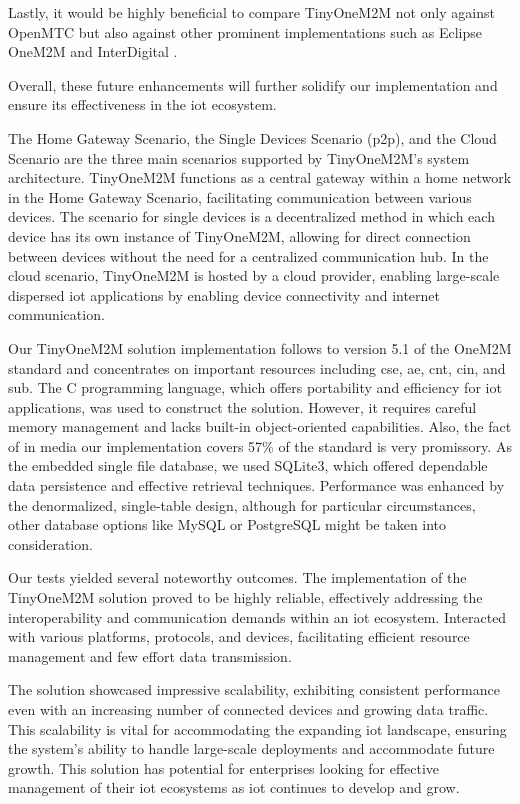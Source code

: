 \documentclass[a4paper,fleqn]{cas-dc}
\begin{document}
Lastly, it would be highly beneficial to compare TinyOneM2M not only against OpenMTC but also against other prominent implementations such as Eclipse OneM2M and InterDigital \cite{M2M2015}.

Overall, these future enhancements will further solidify our implementation and ensure its effectiveness in the \gls{iot} ecosystem.

The Home Gateway Scenario, the Single Devices Scenario (\gls{p2p}), and the Cloud Scenario are the three main scenarios supported by TinyOneM2M's system architecture. TinyOneM2M functions as a central gateway within a home network in the Home Gateway Scenario, facilitating communication between various devices. The scenario for single devices is a decentralized method in which each device has its own instance of TinyOneM2M, allowing for direct connection between devices without the need for a centralized communication hub. In the cloud scenario, TinyOneM2M is hosted by a cloud provider, enabling large-scale dispersed \gls{iot} applications by enabling device connectivity and internet communication. 

Our TinyOneM2M solution implementation follows to version 5.1 of the OneM2M standard and concentrates on important resources including \gls{cse}, \gls{ae}, \gls{cnt}, \gls{cin}, and \gls{sub}. The C programming language, which offers portability and efficiency for \gls{iot} applications, was used to construct the solution. However, it requires careful memory management and lacks built-in object-oriented capabilities. Also, the fact of in media our implementation covers 57\% of the standard is very promissory. As the embedded single file database, we used SQLite3, which offered dependable data persistence and effective retrieval techniques. Performance was enhanced by the denormalized, single-table design, although for particular circumstances, other database options like MySQL or PostgreSQL might be taken into consideration.

Our tests yielded several noteworthy outcomes. The implementation of the TinyOneM2M solution proved to be highly reliable, effectively addressing the interoperability and communication demands within an \gls{iot} ecosystem. Interacted with various platforms, protocols, and devices, facilitating efficient resource management and few effort data transmission. 

The solution showcased impressive scalability, exhibiting consistent performance even with an increasing number of connected devices and growing data traffic. This scalability is vital for accommodating the expanding \gls{iot} landscape, ensuring the system's ability to handle large-scale deployments and accommodate future growth. This solution has potential for enterprises looking for effective management of their \gls{iot} ecosystems as \gls{iot} continues to develop and grow.
\end{document}
